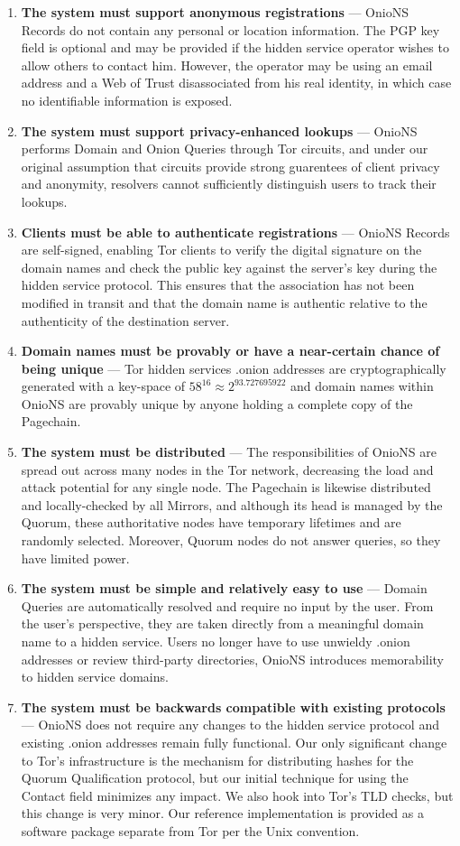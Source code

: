 \begin{enumerate}
	\item \textbf{The system must support anonymous registrations} --- OnioNS Records do not contain any personal or location information. The PGP key field is optional and may be provided if the hidden service operator wishes to allow others to contact him. However, the operator may be using an email address and a Web of Trust disassociated from his real identity, in which case no identifiable information is exposed.
	\item \textbf{The system must support privacy-enhanced lookups} --- OnioNS performs Domain and Onion Queries through Tor circuits, and under our original assumption that circuits provide strong guarentees of client privacy and anonymity, resolvers cannot sufficiently distinguish users to track their lookups.
	\item \textbf{Clients must be able to authenticate registrations} --- OnioNS Records are self-signed, enabling Tor clients to verify the digital signature on the domain names and check the public key against the server's key during the hidden service protocol. This ensures that the association has not been modified in transit and that the domain name is authentic relative to the authenticity of the destination server.
	\item \textbf{Domain names must be provably or have a near-certain chance of being unique} --- Tor hidden services .onion addresses are cryptographically generated with a key-space of $ 58 ^ {16} \approx 2 ^ {93.727695922} $ and domain names within OnioNS are provably unique by anyone holding a complete copy of the Pagechain.
	\item \textbf{The system must be distributed} --- The responsibilities of OnioNS are spread out across many nodes in the Tor network, decreasing the load and attack potential for any single node. The Pagechain is likewise distributed and locally-checked by all Mirrors, and although its head is managed by the Quorum, these authoritative nodes have temporary lifetimes and are randomly selected. Moreover, Quorum nodes do not answer queries, so they have limited power.
	\item \textbf{The system must be simple and relatively easy to use} --- Domain Queries are automatically resolved and require no input by the user. From the user's perspective, they are taken directly from a meaningful domain name to a hidden service. Users no longer have to use unwieldy .onion addresses or review third-party directories, OnioNS introduces memorability to hidden service domains.
	\item \textbf{The system must be backwards compatible with existing protocols} --- OnioNS does not require any changes to the hidden service protocol and existing .onion addresses remain fully functional. Our only significant change to Tor's infrastructure is the mechanism for distributing hashes for the Quorum Qualification protocol, but our initial technique for using the Contact field minimizes any impact. We also hook into Tor's TLD checks, but this change is very minor. Our reference implementation is provided as a software package separate from Tor per the Unix convention.
\end{enumerate}

